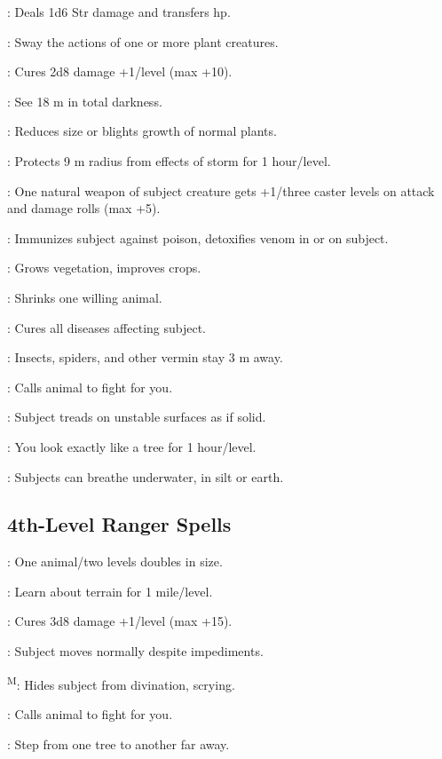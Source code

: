 
: Deals 1d6 Str damage and transfers hp. %

: Sway the actions of one or more plant creatures.

: Cures 2d8 damage +1/level (max +10).

: See 18 m in total darkness.

: Reduces size or blights growth of normal plants.

: Protects 9 m radius from effects of storm for 1 hour/level. %

: One natural weapon of subject creature gets +1/three caster levels on attack and damage rolls (max +5).

: Immunizes subject against poison, detoxifies venom in or on subject.

: Grows vegetation, improves crops.

: Shrinks one willing animal.

: Cures all diseases affecting subject.

: Insects, spiders, and other vermin stay 3 m away.

: Calls animal to fight for you.

: Subject treads on unstable surfaces as if solid. %

: You look exactly like a tree for 1 hour/level.

: Subjects can breathe underwater, in silt or earth. %



\subsection{4th-Level Ranger Spells}

: One animal/two levels doubles in size.

: Learn about terrain for 1 mile/level.

: Cures 3d8 damage +1/level (max +15).

: Subject moves normally despite impediments.

\textsuperscript{M}: Hides subject from divination, scrying.

: Calls animal to fight for you.

: Step from one tree to another far away.

